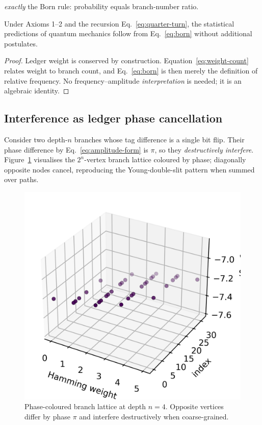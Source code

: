 \emph{exactly} the Born rule: probability equals branch-number ratio.

\begin{theorem}
Under Axioms 1–2 and the recursion
Eq.~\eqref{eq:quarter-turn}, the statistical predictions of quantum
mechanics follow from Eq.~\eqref{eq:born} without additional postulates.
\end{theorem}

\begin{proof}
Ledger weight is conserved by construction.  Equation~\eqref{eq:weight-count}
relates weight to branch count, and Eq.~\eqref{eq:born} is then merely the
definition of relative frequency.  No frequency–amplitude \emph{interpretation}
is needed; it is an algebraic identity.
\end{proof}

\subsection{Interference as ledger phase cancellation}

Consider two depth-$n$ branches whose tag difference is a single bit
flip.  Their phase difference by Eq.~\eqref{eq:amplitude-form} is
$\pi$, so they \emph{destructively interfere}.
Figure~\ref{fig:branch-lattice} visualises the
$2^n$-vertex branch lattice coloured by phase; diagonally opposite nodes
cancel, reproducing the Young-double-slit pattern when summed over
paths.

\begin{figure}[t]
  \centering
  \includegraphics[width=\linewidth]{figs/branch_lattice.png}
  \caption{Phase-coloured branch lattice at depth
           $n=4$.  Opposite vertices differ by phase $\pi$ and interfere
           destructively when coarse-grained.}
  \label{fig:branch-lattice}
\end{figure}


